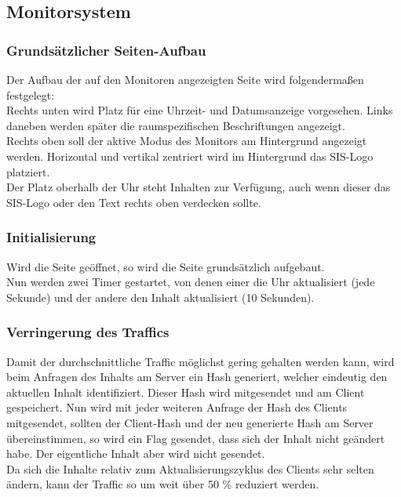 \subsection{Monitorsystem}

\subsubsection{Grundsätzlicher Seiten-Aufbau}

Der Aufbau der auf den Monitoren angezeigten Seite wird folgendermaßen festgelegt:\\
Rechts unten wird Platz für eine Uhrzeit- und Datumsanzeige vorgesehen. Links daneben werden später die raumspezifischen Beschriftungen angezeigt.\\
Rechts oben soll der aktive Modus des Monitors am Hintergrund angezeigt werden. Horizontal und vertikal zentriert wird im Hintergrund das SIS-Logo platziert.\\
Der Platz oberhalb der Uhr steht Inhalten zur Verfügung, auch wenn dieser das SIS-Logo oder den Text rechts oben verdecken sollte.

\subsubsection{Initialisierung}

Wird die Seite geöffnet, so wird die Seite grundsätzlich aufgebaut.\\
Nun werden zwei Timer gestartet, von denen einer die Uhr aktualisiert (jede Sekunde) und der andere den Inhalt aktualisiert (10 Sekunden).

\subsubsection{Verringerung des Traffics}
Damit der durchschnittliche Traffic möglichst gering gehalten werden kann, wird beim Anfragen des Inhalts am Server ein Hash generiert, welcher eindeutig den aktuellen Inhalt identifiziert. Dieser Hash wird mitgesendet und am Client gespeichert. Nun wird mit jeder weiteren Anfrage der Hash des Clients mitgesendet, sollten der Client-Hash und der neu generierte Hash am Server übereinstimmen, so wird ein Flag gesendet, dass sich der Inhalt nicht geändert habe. Der eigentliche Inhalt aber wird nicht gesendet.\\
Da sich die Inhalte relativ zum Aktualisierungszyklus des Clients sehr selten ändern, kann der Traffic so um weit über 50 \% reduziert werden.

